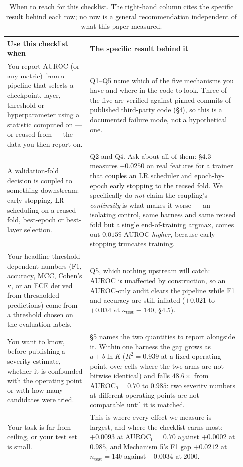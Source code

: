 \documentclass[10pt]{article} %
\begin{document}
\begin{table}[h]
\centering
\small
\begin{tabular}{@{}p{0.33\linewidth}p{0.61\linewidth}@{}}
\toprule
Use this checklist when & The specific result behind it \\
\midrule
You report AUROC (or any metric) from a pipeline that selects a checkpoint, layer, threshold or hyperparameter using a statistic computed on --- or reused from --- the data you then report on. & Q1--Q5 name which of the five mechanisms you have and where in the code to look. Three of the five are verified against pinned commits of published third-party code (§4), so this is a documented failure mode, not a hypothetical one. \\
\addlinespace
A validation-fold decision is coupled to something downstream: early stopping, LR scheduling on a reused fold, best-epoch or best-layer selection. & Q2 and Q4. Ask about all of them: §4.3 measures $+0.0250$ on real features for a trainer that couples an LR scheduler and epoch-by-epoch early stopping to the reused fold. We specifically do \emph{not} claim the coupling's \emph{continuity} is what makes it worse --- an isolating control, same harness and same reused fold but a single end-of-training argmax, comes out $0.0159$ AUROC \emph{higher}, because early stopping truncates training. \\
\addlinespace
Your headline threshold-dependent numbers (F1, accuracy, MCC, Cohen's $\kappa$, or an ECE derived from thresholded predictions) come from a threshold chosen on the evaluation labels. & Q5, which nothing upstream will catch: AUROC is unaffected by construction, so an AUROC-only audit clears the pipeline while F1 and accuracy are still inflated ($+0.021$ to $+0.034$ at $n_{\text{test}}=140$, §4.5). \\
\addlinespace
You want to know, before publishing a severity estimate, whether it is confounded with the operating point or with how many candidates were tried. & §5 names the two quantities to report alongside it. Within one harness the gap grows as $a+b\ln K$ ($R^2=0.939$ at a fixed operating point, over cells where the two arms are not bitwise identical) and falls $48.6\times$ from AUROC$_0=0.70$ to $0.985$; two severity numbers at different operating points are not comparable until it is matched. \\
\addlinespace
Your task is far from ceiling, or your test set is small. & This is where every effect we measure is largest, and where the checklist earns most: $+0.0093$ at AUROC$_0=0.70$ against $+0.0002$ at $0.985$, and Mechanism 5's F1 gap $+0.0212$ at $n_{\text{test}}=140$ against $+0.0034$ at $2000$. \\
\bottomrule
\end{tabular}
\caption{When to reach for this checklist. The right-hand column cites the
specific result behind each row; no row is a general recommendation
independent of what this paper measured.}
\label{tab:checklist-scope}
\end{table}
\end{document}
